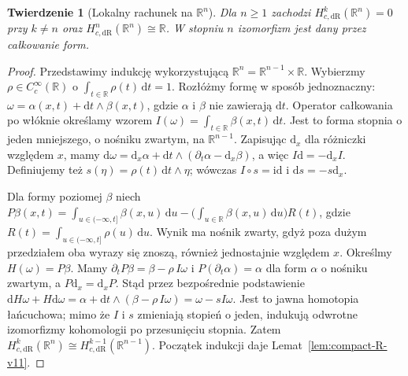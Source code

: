\documentclass[11pt,a4paper,oneside]{report}
\newcommand{\R}{\mathbb{R}}
\newcommand{\id}{\mathrm{id}}
\newcommand{\dd}{\mathrm d}
\theoremstyle{plain}
\newtheorem{twierdzenie}{Twierdzenie}[section]
\theoremstyle{definition}
\theoremstyle{remark}
\begin{document}
\begin{twierdzenie}[Lokalny rachunek na $\R^n$]
\label{thm:compact-Rn-v11}
Dla $n\ge1$ zachodzi
$H_{c,\mathrm{dR}}^k(\R^n)=0$ przy $k\ne n$ oraz
$H_{c,\mathrm{dR}}^n(\R^n)\cong\R$.
W stopniu $n$ izomorfizm jest dany przez całkowanie form.
\end{twierdzenie}
\begin{proof}
Przedstawimy indukcję wykorzystującą $\R^n=\R^{n-1}\times\R$.
Wybierzmy $\rho\in C_c^\infty(\R)$ o
$\int_{t\in\R}\rho(t)\,\dd t=1$.
Rozłóżmy formę w sposób jednoznaczny:
$\omega=\alpha(x,t)+\dd t\wedge\beta(x,t)$,
gdzie $\alpha$ i $\beta$ nie zawierają $\dd t$.
Operator całkowania po włóknie określamy wzorem
$I(\omega)=\int_{t\in\R}\beta(x,t)\,\dd t$.
Jest to forma stopnia o jeden mniejszego, o nośniku zwartym,
na $\R^{n-1}$. Zapisując $\dd_x$ dla różniczki względem $x$,
mamy
$\dd\omega=\dd_x\alpha+\dd t\wedge
(\partial_t\alpha-\dd_x\beta)$, a więc
$I\dd=-\dd_x I$. Definiujemy też
$s(\eta)=\rho(t)\,\dd t\wedge\eta$;
wówczas $I\circ s=\id$ i $\dd s=-s\dd_x$.

Dla formy poziomej $\beta$ niech
$P\beta(x,t)=\int_{u\in(-\infty,t]}\beta(x,u)\,\dd u-
\bigl(\int_{u\in\R}\beta(x,u)\,\dd u\bigr)R(t)$,
gdzie $R(t)=\int_{u\in(-\infty,t]}\rho(u)\,\dd u$.
Wynik ma nośnik zwarty, gdyż poza dużym przedziałem
oba wyrazy się znoszą, również jednostajnie względem $x$.
Określmy $H(\omega)=P\beta$. Mamy
$\partial_t P\beta=\beta-\rho\,I\omega$ i
$P(\partial_t\alpha)=\alpha$ dla form $\alpha$ o
nośniku zwartym, a $P\dd_x=\dd_xP$.
Stąd przez bezpośrednie podstawienie
$\dd H\omega+H\dd\omega=
\alpha+\dd t\wedge(\beta-\rho\,I\omega)
=\omega-sI\omega$.
Jest to jawna homotopia łańcuchowa; mimo że $I$ i $s$
zmieniają stopień o jeden, indukują odwrotne
izomorfizmy kohomologii po przesunięciu stopnia. Zatem
$H_{c,\mathrm{dR}}^k(\R^n)\cong
H_{c,\mathrm{dR}}^{k-1}(\R^{n-1})$.
Początek indukcji daje Lemat~\ref{lem:compact-R-v11}.
\end{proof}
\end{document}
